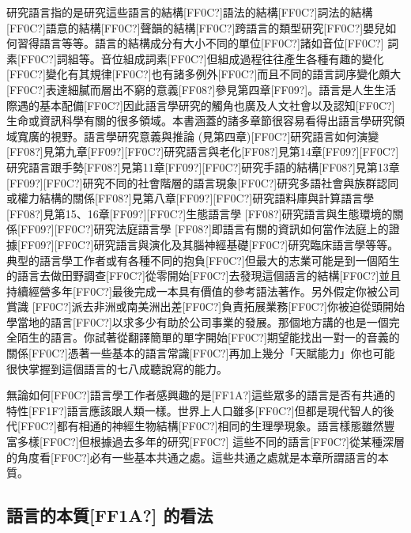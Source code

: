 研究語言指的是研究這些語言的結構[FF0C?]語法的結構[FF0C?]詞法的結構[FF0C?]語意的結構[FF0C?]聲韻的結構[FF0C?]跨語言的類型研究[FF0C?]嬰兒如何習得語言等等。語言的結構成分有大小不同的單位[FF0C?]諸如音位[FF0C?] 詞素[FF0C?]詞組等。音位組成詞素[FF0C?]但組成過程往往產生各種有趣的變化[FF0C?]變化有其規律[FF0C?]也有諸多例外[FF0C?]而且不同的語言詞序變化頗大[FF0C?]表達細膩而層出不窮的意義[FF08?]參見第四章[FF09?]。語言是人生生活際遇的基本配備[FF0C?]因此語言學研究的觸角也廣及人文社會以及認知[FF0C?]生命或資訊科學有關的很多領域。本書涵蓋的諸多章節很容易看得出語言學研究領域寬廣的視野。語言學研究意義與推論 (見第四章)[FF0C?]研究語言如何演變[FF08?]見第九章[FF09?][FF0C?]研究語言與老化[FF08?]見第14章[FF09?][FF0C?]研究語言跟手勢[FF08?]見第11章[FF09?][FF0C?]研究手語的結構[FF08?]見第13章[FF09?][FF0C?]研究不同的社會階層的語言現象[FF0C?]研究多語社會與族群認同或權力結構的關係[FF08?]見第八章[FF09?][FF0C?]研究語料庫與計算語言學[FF08?]見第15、16章[FF09?][FF0C?]生態語言學 [FF08?]研究語言與生態環境的關係[FF09?][FF0C?]研究法庭語言學 [FF08?]即語言有關的資訊如何當作法庭上的證據[FF09?][FF0C?]研究語言與演化及其腦神經基礎[FF0C?]研究臨床語言學等等。典型的語言學工作者或有各種不同的抱負[FF0C?]但最大的志業可能是到一個陌生的語言去做田野調查[FF0C?]從零開始[FF0C?]去發現這個語言的結構[FF0C?]並且持續經營多年[FF0C?]最後完成一本具有價值的參考語法著作。另外假定你被公司賞識 [FF0C?]派去非洲或南美洲出差[FF0C?]負責拓展業務[FF0C?]你被迫從頭開始學當地的語言[FF0C?]以求多少有助於公司事業的發展。那個地方講的也是一個完全陌生的語言。你試著從翻譯簡單的單字開始[FF0C?]期望能找出一對一的音義的關係[FF0C?]憑著一些基本的語言常識[FF0C?]再加上幾分「天賦能力」你也可能很快掌握到這個語言的七八成聽說寫的能力。

無論如何[FF0C?]語言學工作者感興趣的是[FF1A?]這些眾多的語言是否有共通的特性[FF1F?]語言應該跟人類一樣。世界上人口雖多[FF0C?]但都是現代智人的後代[FF0C?]都有相通的神經生物結構[FF0C?]相同的生理學現象。語言樣態雖然豐富多樣[FF0C?]但根據過去多年的研究[FF0C?] 這些不同的語言[FF0C?]從某種深層的角度看[FF0C?]必有一些基本共通之處。這些共通之處就是本章所謂語言的本質。

\subsection{語言的本質[FF1A?]\citet{Hockett1960} 的看法}  %

